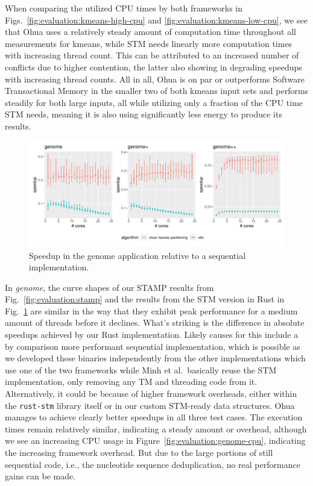 When comparing the utilized CPU times by both frameworks in Figs.~\ref{fig:evaluation:kmeans-high-cpu} and \ref{fig:evaluation:kmeans-low-cpu}, we see that Ohua uses a relatively steady amount of computation time throughout all measurements for kmeans, while STM needs linearly more computation times with increasing thread count.
This can be attributed to an increased number of conflicts due to higher contention, the latter also showing in degrading speedups with increasing thread counts.
All in all, Ohua is on par or outperforms Software Transactional Memory in the smaller two of both kmeans input sets and performs steadily for both large inputs, all while utilizing only a fraction of the CPU time STM needs, meaning it is also using significantly less energy to produce its results.

\begin{figure}
    \centering
    \includegraphics[width=\textwidth,keepaspectratio]{gfx/results/genome_comb}
    \caption{Speedup in the genome application relative to a sequential implementation.}%
    \label{fig:evaluation:genome}
\end{figure}

In \emph{genome}, the curve shapes of our STAMP results from Fig.~\ref{fig:evaluation:stamp} and the results from the STM version in Rust in Fig.~\ref{fig:evaluation:genome} are similar in the way that they exhibit peak performance for a medium amount of threads before it declines.
What's striking is the difference in absolute speedups achieved by our Rust implementation.
Likely causes for this include a by comparison more performant sequential implementation, which is possible as we developed these binaries independently from the other implementations which use one of the two frameworks while Minh et al.\ basically reuse the STM implementation, only removing any TM and threading code from it.
Alternatively, it could be because of higher framework overheads, either within the \texttt{rust-stm} library itself or in our custom STM-ready data structures.
Ohua manages to achieve clearly better speedups in all three test cases.
The execution times remain relatively similar, indicating a steady amount or overhead, although we see an increasing CPU usage in Figure~\ref{fig:evaluation:genome-cpu}, indicating the increasing framework overhead.
But due to the large portions of still sequential code, i.e., the nucleotide sequence deduplication, no real performance gains can be made.

